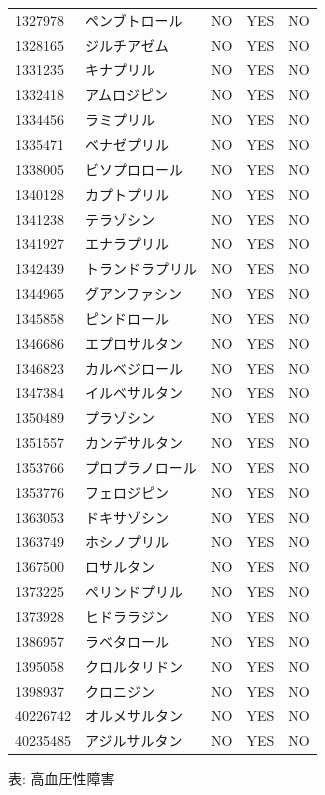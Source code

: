 \documentclass[
  11pt]{book}
\theoremstyle{definition}
\theoremstyle{definition}
\theoremstyle{definition}
\theoremstyle{definition}
\theoremstyle{remark}
\begin{document}
\begin{longtable}[]{@{}lllll@{}}
1327978 & ペンブトロール & NO & YES & NO \\
1328165 & ジルチアゼム & NO & YES & NO \\
1331235 & キナプリル & NO & YES & NO \\
1332418 & アムロジピン & NO & YES & NO \\
1334456 & ラミプリル & NO & YES & NO \\
1335471 & ベナゼプリル & NO & YES & NO \\
1338005 & ビソプロロール & NO & YES & NO \\
1340128 & カプトプリル & NO & YES & NO \\
1341238 & テラゾシン & NO & YES & NO \\
1341927 & エナラプリル & NO & YES & NO \\
1342439 & トランドラプリル & NO & YES & NO \\
1344965 & グアンファシン & NO & YES & NO \\
1345858 & ピンドロール & NO & YES & NO \\
1346686 & エプロサルタン & NO & YES & NO \\
1346823 & カルベジロール & NO & YES & NO \\
1347384 & イルベサルタン & NO & YES & NO \\
1350489 & プラゾシン & NO & YES & NO \\
1351557 & カンデサルタン & NO & YES & NO \\
1353766 & プロプラノロール & NO & YES & NO \\
1353776 & フェロジピン & NO & YES & NO \\
1363053 & ドキサゾシン & NO & YES & NO \\
1363749 & ホシノプリル & NO & YES & NO \\
1367500 & ロサルタン & NO & YES & NO \\
1373225 & ペリンドプリル & NO & YES & NO \\
1373928 & ヒドララジン & NO & YES & NO \\
1386957 & ラベタロール & NO & YES & NO \\
1395058 & クロルタリドン & NO & YES & NO \\
1398937 & クロニジン & NO & YES & NO \\
40226742 & オルメサルタン & NO & YES & NO \\
40235485 & アジルサルタン & NO & YES & NO \\
\end{longtable}

表: \label{tab:HTN1yrFOHypertensiveDisorder} 高血圧性障害
\end{document}
